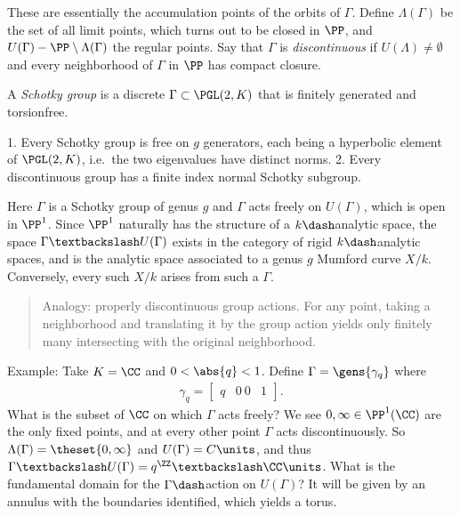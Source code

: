 These are essentially the accumulation points of the orbits of
\(\Gamma\). Define \(\Lambda(\Gamma)\) be the set of all limit points,
which turns out to be closed in \(\PP\), and
\(U(\Gamma) - \PP\setminus \Lambda(\Gamma)\) the regular points. Say
that \(\Gamma\) is \emph{discontinuous} if \(U(\Lambda) \neq \emptyset\)
and every neighborhood of \(\Gamma\) in \(\PP\) has compact closure.

\begin{description}
\tightlist
\item[Definition]
A \emph{Schotky group} is a discrete \(\Gamma \subset \PGL(2, K)\) that
is finitely generated and torsionfree.
\item[Theorem]
\hfill 
1. Every Schotky group is free on \(g\) generators, each being a
hyperbolic element of \(\PGL(2, K)\), i.e.~the two eigenvalues have
distinct norms. 2. Every discontinuous group has a finite index normal
Schotky subgroup.
\end{description}

Here \(\Gamma\) is a Schotky group of genus \(g\) and \(\Gamma\) acts
freely on \(U(\Gamma)\), which is open in \(\PP^1\). Since \(\PP^1\)
naturally has the structure of a \(k\dash\)analytic space, the space
\(\Gamma \textbackslash U(\Gamma)\) exists in the category of rigid
\(k\dash\)analytic spaces, and is the analytic space associated to a
genus \(g\) Mumford curve \(X/k\). Conversely, every such \(X/k\) arises
from such a \(\Gamma\).

\begin{quote}
Analogy: properly discontinuous group actions. For any point, taking a
neighborhood and translating it by the group action yields only finitely
many intersecting with the original neighborhood.
\end{quote}

Example: Take \(K = \CC\) and \(0 < \abs{q} < 1\). Define
\(\Gamma = \gens{\gamma_q}\) where \begin{align*}
\gamma_q =
\begin{bmatrix}
q & 0 \
0 & 1
\end{bmatrix}
.\end{align*} What is the subset of \(\CC\) on which \(\Gamma\) acts
freely? We see \(0, \infty \in \PP^1(\CC)\) are the only fixed points,
and at every other point \(\Gamma\) acts discontinuously. So
\(\Lambda(\Gamma) = \theset{0, \infty}\) and \(U(\Gamma) = C\units\),
and thus
\(\Gamma \textbackslash U(\Gamma) = q^\ZZ \textbackslash \CC\units\).
What is the fundamental domain for the \(\Gamma\dash\)action on
\(U(\Gamma)\)? It will be given by an annulus with the boundaries
identified, which yields a torus.

